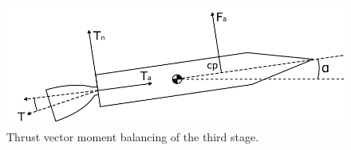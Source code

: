 		
\begin{figure}
\centering
\includegraphics[width=0.7\linewidth]{figures/3_vehicle_design/ThrustVec}
\caption{Thrust vector moment balancing of the third stage.}
\label{fig:ThrustVec}
\end{figure}
		

		